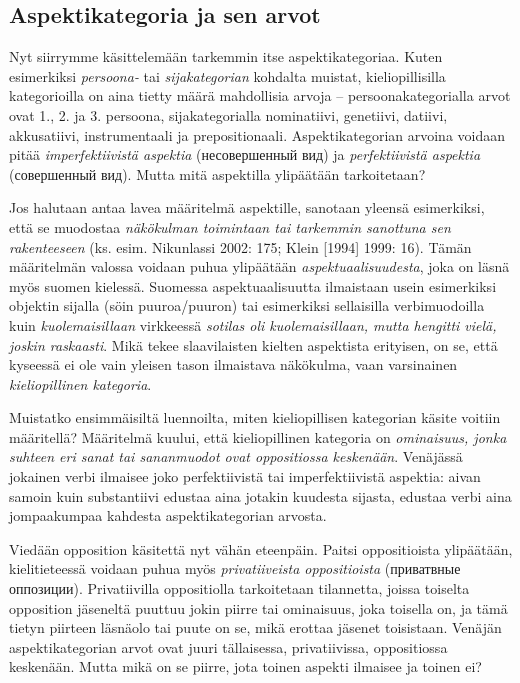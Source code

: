 \documentclass[]{scrartcl}
\begin{document}
\subsection{Aspektikategoria ja sen
arvot}\label{aspektikategoria-ja-sen-arvot}

Nyt siirrymme käsittelemään tarkemmin itse aspektikategoriaa. Kuten
esimerkiksi \emph{persoona-} tai \emph{sijakategorian} kohdalta muistat,
kieliopillisilla kategorioilla on aina tietty määrä mahdollisia arvoja
-- persoonakategorialla arvot ovat 1., 2. ja 3. persoona,
sijakategorialla nominatiivi, genetiivi, datiivi, akkusatiivi,
instrumentaali ja prepositionaali. Aspektikategorian arvoina voidaan
pitää \emph{imperfektiivistä aspektia} (несовершенный вид) ja
\emph{perfektiivistä aspektia} (совершенный вид). Mutta mitä aspektilla
ylipäätään tarkoitetaan?

Jos halutaan antaa lavea määritelmä aspektille, sanotaan yleensä
esimerkiksi, että se muodostaa \emph{näkökulman toimintaan tai tarkemmin
sanottuna sen rakenteeseen} (ks. esim. Nikunlassi 2002: 175; Klein
{[}1994{]} 1999: 16). Tämän määritelmän valossa voidaan puhua ylipäätään
\emph{aspektuaalisuudesta}, joka on läsnä myös suomen kielessä. Suomessa
aspektuaalisuutta ilmaistaan usein esimerkiksi objektin sijalla (söin
puuroa/puuron) tai esimerkiksi sellaisilla verbimuodoilla kuin
\emph{kuolemaisillaan} virkkeessä \emph{sotilas oli kuolemaisillaan,
mutta hengitti vielä, joskin raskaasti}. Mikä tekee slaavilaisten
kielten aspektista erityisen, on se, että kyseessä ei ole vain yleisen
tason ilmaistava näkökulma, vaan varsinainen \emph{kieliopillinen
kategoria}.

Muistatko ensimmäisiltä luennoilta, miten kieliopillisen kategorian
käsite voitiin määritellä? Määritelmä kuului, että kieliopillinen
kategoria on \emph{ominaisuus, jonka suhteen eri sanat tai sananmuodot
ovat oppositiossa keskenään}. Venäjässä jokainen verbi ilmaisee joko
perfektiivistä tai imperfektiivistä aspektia: aivan samoin kuin
substantiivi edustaa aina jotakin kuudesta sijasta, edustaa verbi aina
jompaakumpaa kahdesta aspektikategorian arvosta.

Viedään opposition käsitettä nyt vähän eteenpäin. Paitsi oppositioista
ylipäätään, kielitieteessä voidaan puhua myös \emph{privatiiveista
oppositioista} (приватвные оппозиции). Privatiivilla oppositiolla
tarkoitetaan tilannetta, joissa toiselta opposition jäseneltä puuttuu
jokin piirre tai ominaisuus, joka toisella on, ja tämä tietyn piirteen
läsnäolo tai puute on se, mikä erottaa jäsenet toisistaan. Venäjän
aspektikategorian arvot ovat juuri tällaisessa, privatiivissa,
oppositiossa keskenään. Mutta mikä on se piirre, jota toinen aspekti
ilmaisee ja toinen ei?
\end{document}
